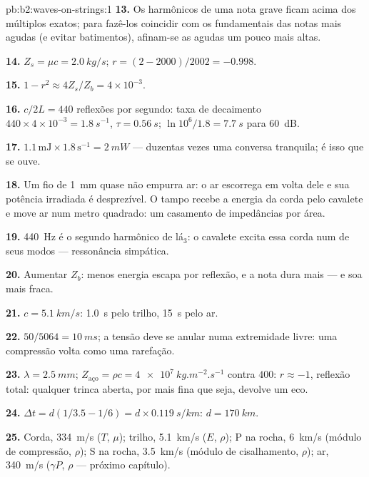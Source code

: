 \begin{solution}{pb:b2:waves-on-strings:1}
\textbf{13.} Os harmônicos de uma nota grave ficam acima dos múltiplos
exatos; para fazê-los coincidir com os fundamentais das notas mais
agudas (e evitar batimentos), afinam-se as agudas um pouco mais altas.

\textbf{14.} $Z_s = \mu c = \qty{2.0}{kg/s}$; $r = (2 - 2000)/2002 = -0.998$.

\textbf{15.} $1 - r^2 \approx 4Z_s/Z_b = 4 \times 10^{-3}$.

\textbf{16.} $c/2L = 440$ reflexões por segundo: taxa de decaimento $440 \times 4 \times
10^{-3} = \qty{1.8}{s^{-1}}$, $\tau = \qty{0.56}{s}$; $\ln10^6/1.8 = \qty{7.7}{s}$ para
\qty{60}{dB}.

\textbf{17.} $1.1\,\text{mJ} \times 1.8\,\text{s}^{-1} = \qty{2}{mW}$ --- duzentas
vezes uma conversa tranquila; é isso que se ouve.

\textbf{18.} Um fio de \qty{1}{mm} quase não empurra ar: o ar escorrega em
volta dele e sua potência irradiada é desprezível. O tampo recebe a
energia da corda pelo cavalete e move ar num metro quadrado:
um casamento de impedâncias por área.

\textbf{19.} \qty{440}{Hz} é o segundo harmônico de lá$_3$: o cavalete excita
essa corda num de seus modos --- ressonância simpática.

\textbf{20.} Aumentar $Z_b$: menos energia escapa por reflexão, e a nota dura
mais --- e soa mais fraca.

\textbf{21.} $c = \qty{5.1}{km/s}$: \qty{1.0}{s} pelo trilho, \qty{15}{s} pelo ar.

\textbf{22.} $50/5064 = \qty{10}{ms}$; a tensão deve se anular numa extremidade livre:
uma compressão volta como uma rarefação.

\textbf{23.} $\lambda = \qty{2.5}{mm}$; $Z_{\text{aço}} = \rho c = \qty{4e7}{kg.m^{-2}.s^{-1}}$
contra $400$: $r \approx -1$, reflexão total: qualquer trinca aberta, por mais
fina que seja, devolve um eco.

\textbf{24.} $\Delta t = d(1/3.5 - 1/6) = d \times \qty{0.119}{s/km}$: $d = \qty{170}{km}$.

\textbf{25.} Corda, \qty{334}{m/s} ($T$, $\mu$); trilho, \qty{5.1}{km/s} ($E$, $\rho$);
P na rocha, \qty{6}{km/s} (módulo de compressão, $\rho$); S na rocha, \qty{3.5}{km/s}
(módulo de cisalhamento, $\rho$); ar, \qty{340}{m/s} ($\gamma P$, $\rho$ --- próximo capítulo).
\end{solution}
